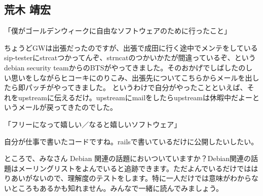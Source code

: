 \documentclass[mingoth,a4paper]{jsarticle}
\begin{document}
\begin{multicols}{2}
\subsection{荒木 靖宏}

「僕がゴールデンウィークに自由なソフトウェアのために行ったこと」

ちょうどGWは出張だったのですが、出張で成田に行く途中でメンテをしているsip-testerにstrcatつかってんぞ、strncatのつかいかたが間違っているぞ、というdebian
security teamからのBTSがやってきました。そのおかげでしばしたのしい思いをしながらヒコーキにのりこみ、出張先についてこちらからメールを出したら即パッチがやってきました。
というわけで自分がやったことといえば、それをupstreamに伝えるだけ。upstreamにmailをしたらupstreamは休暇中だよーというメールが戻ってきたのでした。

「フリーになって嬉しい／なると嬉しいソフトウェア」

自分が仕事で書いたコードですね。railsで書いているだけに公開したいしたい。

\end{multicols}


ところで、みなさん Debian 関連の話題においついていますか？Debian関連の話
題はメーリングリストをよんでいると追跡できます。ただよんでいるだけではは
りあいがないので、理解度のテストをします。特に一人だけでは意味がわからな
いところもあるかも知れません。みんなで一緒に読んでみましょう。
\end{document}
